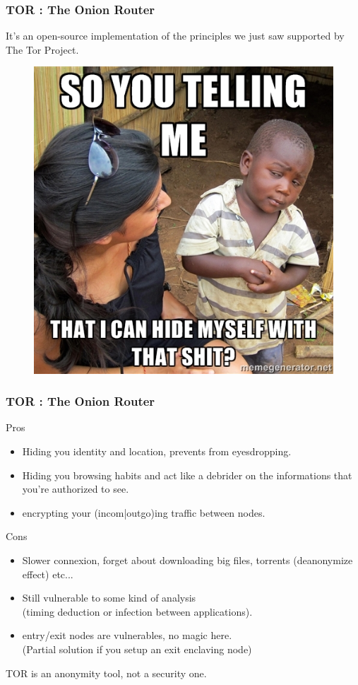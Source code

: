 \begin{frame}
\frametitle{TOR : The Onion Router}
It's an open-source implementation of the principles we just saw supported by
The Tor Project.
\begin{figure}
\includegraphics[width=0.5\linewidth]{./materials/septical_boy}
\end{figure}
\end{frame}
\begin{frame}
\frametitle{TOR : The Onion Router}
\begin{block}{Pros}
\begin{itemize}
\item Hiding you identity and location, prevents from eyesdropping.
\item Hiding you browsing habits and act like a debrider on the informations that
you're authorized to see.
\item encrypting your (incom|outgo)ing traffic between nodes.
\end{itemize}
\end{block}
\begin{block}{Cons}
\begin{itemize}
\item Slower connexion, forget about downloading big files, torrents
(deanonymize effect) etc...
\item Still vulnerable to some kind of analysis
\\ (timing deduction or infection between applications).
\item entry/exit nodes are vulnerables, no magic here.
\\ (Partial solution if you setup an exit enclaving node)
\end{itemize}
\end{block}
TOR is an anonymity tool, not a security one.
\end{frame}

